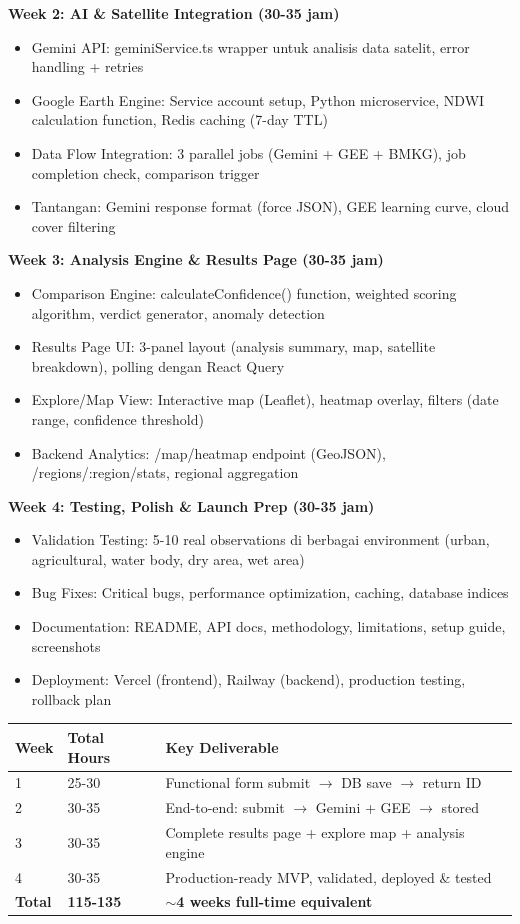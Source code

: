 \documentclass[12pt,a4paper]{article}
\begin{document}
\textbf{Week 2: AI \& Satellite Integration (30-35 jam)}
\begin{itemize}
  \item Gemini API: geminiService.ts wrapper untuk analisis data satelit, error handling + retries
  \item Google Earth Engine: Service account setup, Python microservice, NDWI calculation function, Redis caching (7-day TTL)
  \item Data Flow Integration: 3 parallel jobs (Gemini + GEE + BMKG), job completion check, comparison trigger
  \item Tantangan: Gemini response format (force JSON), GEE learning curve, cloud cover filtering
\end{itemize}

\textbf{Week 3: Analysis Engine \& Results Page (30-35 jam)}
\begin{itemize}
  \item Comparison Engine: calculateConfidence() function, weighted scoring algorithm, verdict generator, anomaly detection
  \item Results Page UI: 3-panel layout (analysis summary, map, satellite breakdown), polling dengan React Query
  \item Explore/Map View: Interactive map (Leaflet), heatmap overlay, filters (date range, confidence threshold)
  \item Backend Analytics: /map/heatmap endpoint (GeoJSON), /regions/:region/stats, regional aggregation
\end{itemize}

\textbf{Week 4: Testing, Polish \& Launch Prep (30-35 jam)}
\begin{itemize}
  \item Validation Testing: 5-10 real observations di berbagai environment (urban, agricultural, water body, dry area, wet area)
  \item Bug Fixes: Critical bugs, performance optimization, caching, database indices
  \item Documentation: README, API docs, methodology, limitations, setup guide, screenshots
  \item Deployment: Vercel (frontend), Railway (backend), production testing, rollback plan
\end{itemize}

\begin{tabularx}{\textwidth}{|l|l|X|}
  \hline
  \textbf{Week} & \textbf{Total Hours} & \textbf{Key Deliverable} \\
  \hline
  1 & 25-30 & Functional form submit $\rightarrow$ DB save $\rightarrow$ return ID \\
  2 & 30-35 & End-to-end: submit $\rightarrow$ Gemini + GEE $\rightarrow$ stored \\
  3 & 30-35 & Complete results page + explore map + analysis engine \\
  4 & 30-35 & Production-ready MVP, validated, deployed \& tested \\
  \textbf{Total} & \textbf{115-135} & \textbf{$\sim$4 weeks full-time equivalent} \\
  \hline
\end{tabularx}
\end{document}
